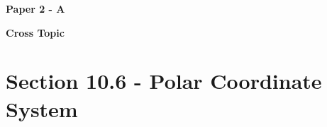 \documentclass[12pt, a4paper]{article}
\begin{document}
\textbf{Paper 2 - A}
\begin{enumx}[label=\arabic*.,start=1]
\item {}\label{DSE2012S-CoreP2-Q26} 
\item {}\label{DSE2012P-CoreP2-Q25} 
\item {}\label{DSE2019-CoreP2-Q25} 
\item {}\label{DSE2021-CoreP2-Q23} 
\end{enumx}
\textbf{Cross Topic}
\begin{enumx}[label=\arabic*.,start=5]
\item {}\label{DSE2012S-CoreP1-Q08} 
\item {}\label{DSE2014-CoreP1-Q08} 
\item {}\label{DSE2017-CoreP1-Q06} 
\end{enumx}




\section*{Section 10.6 - Polar Coordinate System}\label{section:1-10-6}
\end{document}
